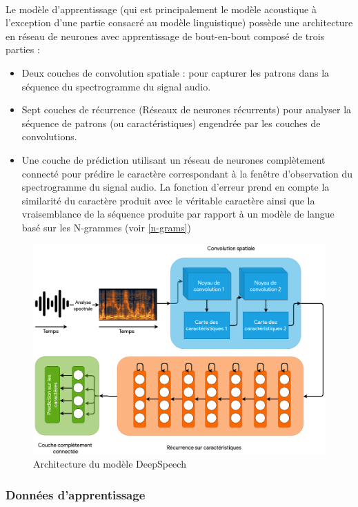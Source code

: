 		\paragraph{}
		Le modèle d'apprentissage (qui est principalement le modèle acoustique à l'exception d'une partie consacré au modèle linguistique) possède une architecture en réseau de neurones avec apprentissage de bout-en-bout composé de trois parties : 
		\begin{itemize}
			\item Deux couches de convolution spatiale : pour capturer les patrons dans la séquence du spectrogramme du signal audio.
			\item Sept couches de récurrence (Réseaux de neurones récurrents) pour analyser la séquence de patrons (ou caractéristiques) engendrée par les couches de convolutions. 
			\item Une couche de prédiction utilisant un réseau de neurones complètement connecté pour prédire le caractère correspondant à la fenêtre d'observation du spectrogramme du signal audio. La fonction d'erreur prend en compte la similarité du caractère produit avec le véritable caractère ainsi que la vraisemblance de la séquence produite par rapport à un modèle de langue basé sur les N-grammes (voir \ref{n-grams})
		\end{itemize}
		\begin{figure}[H] 
			\centering
			\includegraphics[width=0.88\linewidth]{images/Conception/ASR/deeps_speech_arch.png}
			\caption{Architecture du modèle DeepSpeech \cite{deepspeech_paper}}
			\label{fig:deepSpeechArch}
			
		\end{figure}
		\subsubsection*{Données d'apprentissage}
